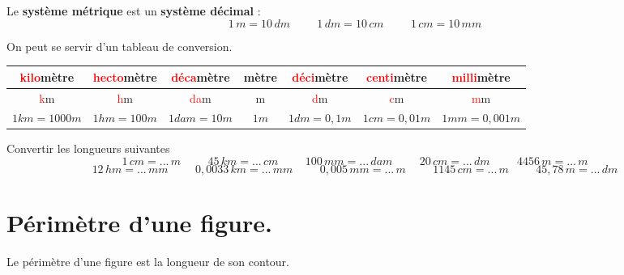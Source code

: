 \documentclass[a4paper,dvipsnames]{article}
\begin{document}
\begin{Def}
Le \textbf{système métrique} est un \textbf{système décimal} :\\
\[1\, m=10\, dm \hspace{1cm} 1\, dm=10\, cm \hspace{1cm}1\, cm=10\, mm\]
\end{Def}

\begin{Mt}
On peut se servir d'un tableau de conversion.
\begin{center}
\begin{tabular}{c|c|c|c|c|c|c}
    \textcolor{red}{kilo}mètre & \textcolor{red}{hecto}mètre & \textcolor{red}{déca}mètre & mètre & \textcolor{red}{déci}mètre & \textcolor{red}{centi}mètre & \textcolor{red}{milli}mètre  \\ \hline 
    \textcolor{red}{k}m & \textcolor{red}{h}m & \textcolor{red}{da}m & m & \textcolor{red}{d}m & \textcolor{red}{c}m & \textcolor{red}{m}m \\ \hline
    \(1 km = 1 000 m\) & \(1 hm = 100 m\) & \(1 dam = 10 m\) & \(1 m\) & \(1 dm = 0,1 m\) & \(1 cm = 0,01 m\) & \(1 mm = 0,001 m\)
\end{tabular}
\end{center}
\end{Mt}

\begin{ExOApp}[]
Convertir les longueurs suivantes
\[1 \,cm = ... \,m \hspace{1cm} 45 \,km = ... \,cm \hspace{1cm} 100 \,mm = ... \,dam \hspace{1cm} 20 \,cm = ... \,dm \hspace{1cm} 4456 \,m = ... \,m\] \[12 \,hm = ... \,mm \hspace{1cm} 0,0033 \,km = ... \,mm \hspace{1cm} 0,005 \,mm = ... \,m \hspace{1cm} 1145 \,cm = ... \,m \hspace{1cm} 45,78 \,m = ... \,dm\]
\end{ExOApp}

\section{Périmètre d'une figure.}

\begin{Def}
Le périmètre d'une figure est la longueur de son contour.
\end{Def}
\end{document}
